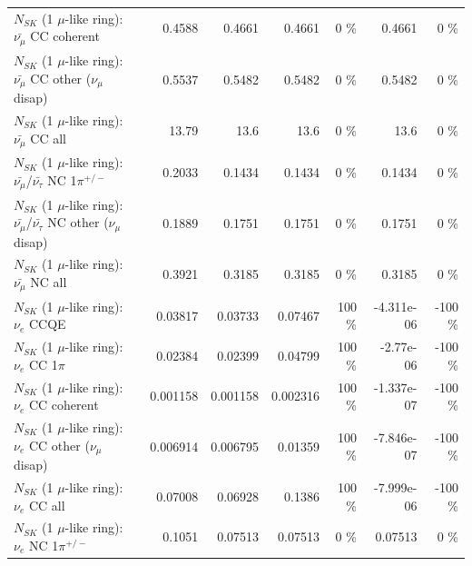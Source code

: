 \begin{table}
\begin{tabular}{| l | r | r | r  r | r  r |}
                       $N_{SK}$ (1 $\mu$-like ring): $\bar{\nu_\mu}$ CC coherent &          0.4588 &          0.4661 &          0.4661 &        0 \%  &          0.4661 &        0 \%  \\ 
        $N_{SK}$ (1 $\mu$-like ring): $\bar{\nu_\mu}$ CC other ($\nu_\mu$ disap) &          0.5537 &          0.5482 &          0.5482 &        0 \%  &          0.5482 &        0 \%  \\ 
                          $N_{SK}$ (1 $\mu$-like ring): $\bar{\nu_{\mu}}$ CC all &           13.79 &            13.6 &            13.6 &        0 \%  &            13.6 &        0 \%  \\ 
\hline
  $N_{SK}$ (1 $\mu$-like ring): $\bar{\nu_\mu}$/$\bar{\nu_\tau}$ NC 1$\pi^{+/-}$ &          0.2033 &          0.1434 &          0.1434 &        0 \%  &          0.1434 &        0 \%  \\ 
$N_{SK}$ (1 $\mu$-like ring): $\bar{\nu_\mu}$/$\bar{\nu_\tau}$ NC other ($\nu_\mu$ disap) &          0.1889 &          0.1751 &          0.1751 &        0 \%  &          0.1751 &        0 \%  \\ 
                          $N_{SK}$ (1 $\mu$-like ring): $\bar{\nu_{\mu}}$ NC all &          0.3921 &          0.3185 &          0.3185 &        0 \%  &          0.3185 &        0 \%  \\ 
\hline
\hline
\hline
                                      $N_{SK}$ (1 $\mu$-like ring): $\nu_e$ CCQE &         0.03817 &         0.03733 &         0.07467 &      100 \%  &      -4.311e-06 &     -100 \%  \\ 
                                 $N_{SK}$ (1 $\mu$-like ring): $\nu_e$ CC 1$\pi$ &         0.02384 &         0.02399 &         0.04799 &      100 \%  &       -2.77e-06 &     -100 \%  \\ 
                               $N_{SK}$ (1 $\mu$-like ring): $\nu_e$ CC coherent &        0.001158 &        0.001158 &        0.002316 &      100 \%  &      -1.337e-07 &     -100 \%  \\ 
                $N_{SK}$ (1 $\mu$-like ring): $\nu_e$ CC other ($\nu_\mu$ disap) &        0.006914 &        0.006795 &         0.01359 &      100 \%  &      -7.846e-07 &     -100 \%  \\ 
                                  $N_{SK}$ (1 $\mu$-like ring): $\nu_{e}$ CC all &         0.07008 &         0.06928 &          0.1386 &      100 \%  &      -7.999e-06 &     -100 \%  \\ 
\hline
                           $N_{SK}$ (1 $\mu$-like ring): $\nu_e$ NC 1$\pi^{+/-}$ &          0.1051 &         0.07513 &         0.07513 &        0 \%  &         0.07513 &        0 \%  \\ 

\end{tabular}
\end{table}
